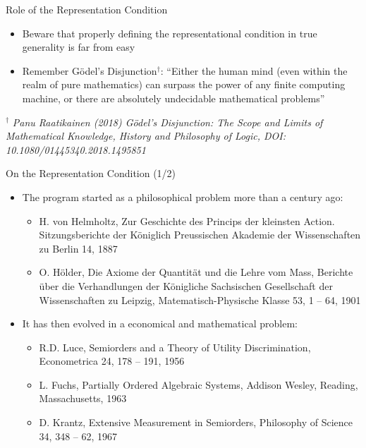\documentclass{beamer}
\begin{document}
\begin{frame}{\centerline{Role of the Representation Condition}}

\begin{itemize}
\item Beware that properly defining the representational condition in true generality is far from easy
\item Remember G\"{o}del's Disjunction$^\dag$: ``Either the human mind (even within the realm of pure mathematics) can surpass the power of any finite computing machine, or there are absolutely undecidable mathematical problems''
\end{itemize}

$^\dag$ \textit{\small
Panu Raatikainen (2018) G\"{o}del's Disjunction: The Scope and Limits of Mathematical Knowledge, History and Philosophy of Logic, DOI: 10.1080/01445340.2018.1495851}

\end{frame}

\begin{frame}{\centerline{On the Representation Condition (1/2)}}

\begin{itemize}
\item The program started as a philosophical problem more than a century ago:
\begin{itemize}
\item H. von Helmholtz, Zur Geschichte des Princips der kleinsten Action. Sitzungsberichte der K\"{o}niglich Preussischen Akademie der Wissenschaften zu Berlin 14, 1887
\item O. H\"{o}lder, Die Axiome der Quantit\"{a}t und die Lehre vom Mass, Berichte \"{u}ber die Verhandlungen der K\"{o}nigliche Sachsischen Gesellschaft der Wissenschaften zu Leipzig, Matematisch-Physische Klasse 53, 1 -- 64, 1901
\end{itemize}
\item It has then evolved in a economical and mathematical problem:
\begin{itemize}
\item R.D. Luce, Semiorders and a Theory of Utility Discrimination, Econometrica 24, 178 -- 191, 1956
\item L. Fuchs, Partially Ordered Algebraic Systems, Addison Wesley, Reading, Massachusetts, 1963
\item D. Krantz, Extensive Measurement in Semiorders, Philosophy of Science 34, 348 -- 62, 1967
\end{itemize}
\end{itemize}


\end{frame}
\end{document}
